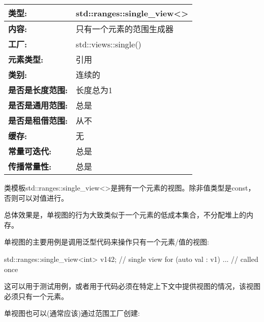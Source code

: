 \begin{longtable}[c]{|l|l|}
\hline
\textbf{类型:}                 & std::ranges::single\_view\textless{}\textgreater{} \\ \hline
\endfirsthead
%
\endhead
%
\textbf{内容:}              & 只有一个元素的范围生成器         \\ \hline
\textbf{工厂:}              & std::views::single()                               \\ \hline
\textbf{元素类型:}         & 引用                                          \\ \hline
\textbf{类别:}             & 连续的                                         \\ \hline
\textbf{是否是长度范围:}       & 长度总为1                                 \\ \hline
\textbf{是否是通用范围:}      & 总是                                             \\ \hline
\textbf{是否是租借范围:}    & 从不                                              \\ \hline
\textbf{缓存:}               & 无                                            \\ \hline
\textbf{常量可迭代:}       & 总是                                             \\ \hline
\textbf{传播常量性:} & 总是                                             \\ \hline
\end{longtable}

类模板std::ranges::single\_view<>是拥有一个元素的视图。除非值类型是const，否则可以对值进行。

总体效果是，单视图的行为大致类似于一个元素的低成本集合，不分配堆上的内存。

单视图的主要用例是调用泛型代码来操作只有一个元素/值的视图:

\begin{cpp}
std::ranges::single_view<int> v1{42}; // single view
for (auto val : v1) {
	... // called once
}
\end{cpp}

这可以用于测试用例，或者用于代码必须在特定上下文中提供视图的情况，该视图必须只有一个元素。


单视图也可以(通常应该)通过范围工厂创建:

